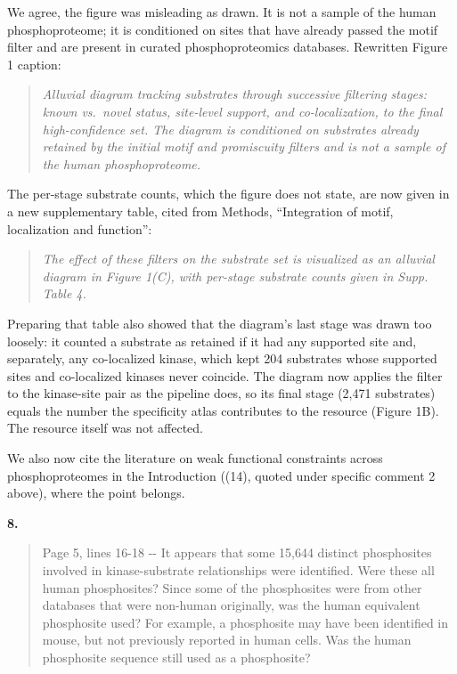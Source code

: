 \documentclass[
]{article}
\begin{document}
We agree, the figure was misleading as drawn. It is not a sample of the
human phosphoproteome; it is conditioned on sites that have already
passed the motif filter and are present in curated phosphoproteomics
databases. Rewritten Figure 1 caption:

\begin{quote}
\emph{Alluvial diagram tracking substrates through successive filtering
stages: known vs.~novel status, site-level support, and co-localization,
to the final high-confidence set. The diagram is conditioned on
substrates already retained by the initial motif and promiscuity filters
and is not a sample of the human phosphoproteome.}
\end{quote}

The per-stage substrate counts, which the figure does not state, are now
given in a new supplementary table, cited from Methods, ``Integration of
motif, localization and function'':

\begin{quote}
\emph{The effect of these filters on the substrate set is visualized as
an alluvial diagram in Figure 1(C), with per-stage substrate counts
given in Supp. Table 4.}
\end{quote}

Preparing that table also showed that the diagram's last stage was drawn
too loosely: it counted a substrate as retained if it had any supported
site and, separately, any co-localized kinase, which kept 204 substrates
whose supported sites and co-localized kinases never coincide. The
diagram now applies the filter to the kinase-site pair as the pipeline
does, so its final stage (2,471 substrates) equals the number the
specificity atlas contributes to the resource (Figure 1B). The resource
itself was not affected.

We also now cite the literature on weak functional constraints across
phosphoproteomes in the Introduction ((14), quoted under specific
comment 2 above), where the point belongs.

\textbf{8.}

\begin{quote}
Page 5, lines 16-18 -\/- It appears that some 15,644 distinct
phosphosites involved in kinase-substrate relationships were identified.
Were these all human phosphosites? Since some of the phosphosites were
from other databases that were non-human originally, was the human
equivalent phosphosite used? For example, a phosphosite may have been
identified in mouse, but not previously reported in human cells. Was the
human phosphosite sequence still used as a phosphosite?
\end{quote}
\end{document}
